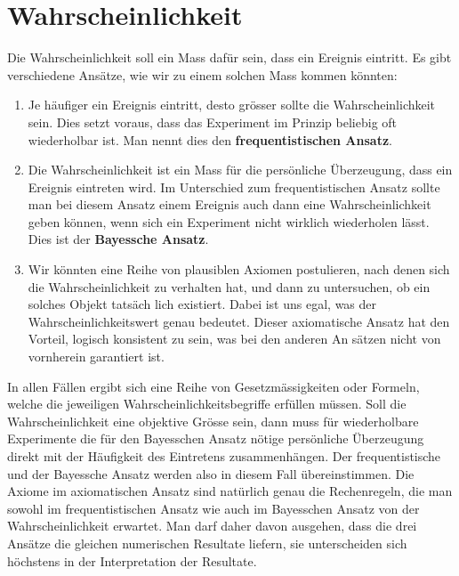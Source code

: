 \documentclass[../Main.tex]{subfiles}
\begin{document}
\section{Wahrscheinlichkeit}
Die Wahrscheinlichkeit soll ein Mass dafür sein, dass ein Ereignis eintritt. Es gibt verschiedene Ansätze, wie wir zu einem solchen Mass kommen könnten: 
\begin{enumerate}
    \item Je häufiger ein Ereignis eintritt, desto grösser sollte die Wahrscheinlichkeit sein. Dies setzt voraus, dass das Experiment im Prinzip beliebig oft wiederholbar ist. Man nennt dies den \textbf{frequentistischen Ansatz}. 
    \item Die Wahrscheinlichkeit ist ein Mass für die persönliche Überzeugung, dass ein Ereignis eintreten wird. Im Unterschied zum frequentistischen Ansatz sollte man bei diesem Ansatz einem Ereignis auch dann eine Wahrscheinlichkeit geben können, wenn sich ein Experiment nicht wirklich wiederholen lässt. Dies ist der \textbf{Bayessche Ansatz}. 
    \item Wir könnten eine Reihe von plausiblen Axiomen postulieren, nach denen sich die Wahrscheinlichkeit zu verhalten hat, und dann zu untersuchen, ob ein solches Objekt tatsäch lich existiert. Dabei ist uns egal, was der Wahrscheinlichkeitswert genau bedeutet. Dieser axiomatische Ansatz hat den Vorteil, logisch konsistent zu sein, was bei den anderen An sätzen nicht von vornherein garantiert ist. 
\end{enumerate}

In allen Fällen ergibt sich eine Reihe von Gesetzmässigkeiten oder Formeln, welche die jeweiligen Wahrscheinlichkeitsbegriffe erfüllen müssen. Soll die Wahrscheinlichkeit eine objektive Grösse sein, dann muss für wiederholbare Experimente die für den Bayesschen Ansatz nötige persönliche Überzeugung direkt mit der Häufigkeit des Eintretens zusammenhängen. Der frequentistische und der Bayessche Ansatz werden also in diesem Fall übereinstimmen. Die Axiome im axiomatischen Ansatz sind natürlich genau die Rechenregeln, die man sowohl im frequentistischen Ansatz wie auch im Bayesschen Ansatz von der Wahrscheinlichkeit erwartet. Man darf daher davon ausgehen, dass die drei Ansätze die gleichen numerischen Resultate liefern, sie unterscheiden sich höchstens in der Interpretation der Resultate.

\end{document}
